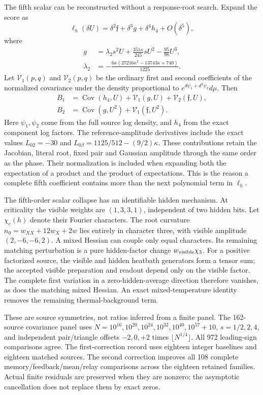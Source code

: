 The fifth scalar can be reconstructed without a response-root search. Expand the score as
\begin{equation}
 \ell_h(\delta U)=\delta^2\mathfrak f
 +\delta^3g+\delta^4h_4+O(\delta^5),
\end{equation}
where
\begin{align}
 g&=\lambda_2s^2U+\frac{351\kappa}{245}sU^2-\frac{95}{98}U^3,\\
 \lambda_2&=-\frac{6\kappa(27216\kappa^2-13743\kappa+740)}{1225}.
\end{align}
Let $\mathcal V_1(p,q)$ and $\mathcal V_2(p,q)$ be the ordinary first and second coefficients of the normalized covariance under the density proportional to $e^{d\psi_1+d^2\psi_2}d\mu$. Then
\begin{align}
 B_1&=\operatorname{Cov}(h_4,U)+\mathcal V_1(g,U)
       +\mathcal V_2(\mathfrak f,U),\\
 B_2&=\operatorname{Cov}(g,U^2)+\mathcal V_1(\mathfrak f,U^2).
\end{align}
Here $\psi_1,\psi_2$ come from the full source log density, and $h_4$ from the exact component log factors. The reference-amplitude derivatives include the exact values $L_{02}=-30$ and $L_{0\beta}=1125/512-(9/2)\kappa$. These contributions retain the Jacobian, literal root, fixed pair and Gaussian amplitude through the same order as the phase. Their normalization is included when expanding both the expectation of a product and the product of expectations. This is the reason a complete fifth coefficient contains more than the next polynomial term in $\ell_h$.

The fifth-order scalar collapse has an identifiable hidden mechanism. At criticality the visible weights are $(1,3,3,1)$, independent of two hidden bits. Let $\chi_c(h)$ denote their Fourier characters. The root curvature
$n_0=w_{XX}+12w_X+2w$ lies entirely in character three, with visible amplitude $(2,-6,-6,2)$. A mixed Hessian can couple only equal characters. Its remaining matching perturbation is a pure hidden-factor change $w_{\rm visible}\chi_3$. For a positive factorized source, the visible and hidden heatbath generators form a tensor sum; the accepted visible preparation and readout depend only on the visible factor. The complete first variation in a zero-hidden-average direction therefore vanishes, as does the matching mixed Hessian. An exact mixed-temperature identity removes the remaining thermal-background term.

These are source symmetries, not ratios inferred from a finite panel. The 162-source covariance panel uses $N=10^{16},10^{20},10^{24},10^{32},10^{40},10^{57}+10$, $s=1/2,2,4$, and independent pair/triangle offsets $-2,0,+2$ times $\lfloor N^{1/4}\rfloor$. All 972 leading-sign comparisons agree. The first-correction record uses eighteen integer baselines and eighteen matched sources. The second correction improves all 108 complete memory/feedback/mean/relay comparisons across the eighteen retained families. Actual finite residuals are preserved when they are nonzero; the asymptotic cancellation does not replace them by exact zeros.

